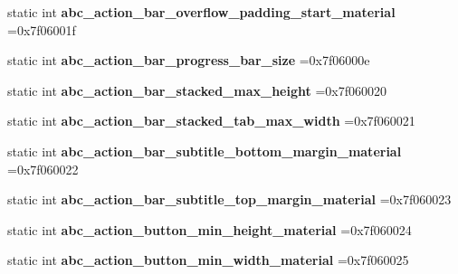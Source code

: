 \begin{DoxyCompactItemize}
\item 
\mbox{\label{classandroid_1_1support_1_1v4_1_1R_1_1dimen_aafa3525229ab7017e493ec9731fb3b9c}} 
static int {\bfseries abc\+\_\+action\+\_\+bar\+\_\+overflow\+\_\+padding\+\_\+start\+\_\+material} =0x7f06001f
\item 
\mbox{\label{classandroid_1_1support_1_1v4_1_1R_1_1dimen_a6d8849e88e6279826ff0cd94a88476f3}} 
static int {\bfseries abc\+\_\+action\+\_\+bar\+\_\+progress\+\_\+bar\+\_\+size} =0x7f06000e
\item 
\mbox{\label{classandroid_1_1support_1_1v4_1_1R_1_1dimen_a23bdb5d211407fabf3f999718d1af1d6}} 
static int {\bfseries abc\+\_\+action\+\_\+bar\+\_\+stacked\+\_\+max\+\_\+height} =0x7f060020
\item 
\mbox{\label{classandroid_1_1support_1_1v4_1_1R_1_1dimen_acfd8d89b84e3fabc464361128f70cdd6}} 
static int {\bfseries abc\+\_\+action\+\_\+bar\+\_\+stacked\+\_\+tab\+\_\+max\+\_\+width} =0x7f060021
\item 
\mbox{\label{classandroid_1_1support_1_1v4_1_1R_1_1dimen_a8f4f02246eae1c86bd72cf06b47a9f3d}} 
static int {\bfseries abc\+\_\+action\+\_\+bar\+\_\+subtitle\+\_\+bottom\+\_\+margin\+\_\+material} =0x7f060022
\item 
\mbox{\label{classandroid_1_1support_1_1v4_1_1R_1_1dimen_af498fa77951bd8857e05274fb358847d}} 
static int {\bfseries abc\+\_\+action\+\_\+bar\+\_\+subtitle\+\_\+top\+\_\+margin\+\_\+material} =0x7f060023
\item 
\mbox{\label{classandroid_1_1support_1_1v4_1_1R_1_1dimen_ae3b085441c034baf5efe8a5af2ce1765}} 
static int {\bfseries abc\+\_\+action\+\_\+button\+\_\+min\+\_\+height\+\_\+material} =0x7f060024
\item 
\mbox{\label{classandroid_1_1support_1_1v4_1_1R_1_1dimen_a1c917bc06ea42b116f12afad3515d57b}} 
static int {\bfseries abc\+\_\+action\+\_\+button\+\_\+min\+\_\+width\+\_\+material} =0x7f060025

\end{DoxyCompactItemize}

